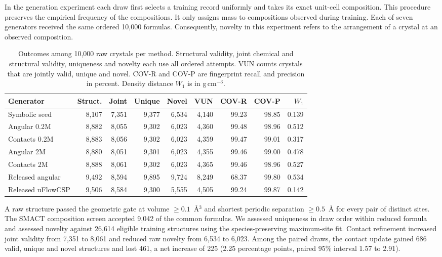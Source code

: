 In the generation experiment each draw first selects a training record uniformly and takes its exact unit-cell composition. This procedure preserves the empirical frequency of the compositions. It only assigns mass to compositions observed during training. Each of seven generators received the same ordered 10,000 formulas. Consequently, novelty in this experiment refers to the arrangement of a crystal at an observed composition.

\begin{table}[tbp]\centering\small
\caption{Outcomes among 10,000 raw crystals per method. Structural validity, joint chemical and structural validity, uniqueness and novelty each use all ordered attempts. VUN counts crystals that are jointly valid, unique and novel. COV-R and COV-P are fingerprint recall and precision in percent. Density distance $W_1$ is in g\,cm$^{-3}$.}
\label{tab:gen-dn}
\setlength{\tabcolsep}{3pt}
\begin{tabular}{lrrrrrrrr}\hline
Generator & Struct. & Joint & Unique & Novel & VUN & COV-R & COV-P & $W_1$\\\hline
Symbolic seed & 8,107 & 7,351 & 9,377 & 6,534 & 4,140 & 99.23 & 98.85 & 0.139\\
Angular 0.2M & 8,882 & 8,055 & 9,302 & 6,023 & 4,360 & 99.48 & 98.96 & 0.512\\
Contacts 0.2M & 8,883 & 8,056 & 9,302 & 6,023 & 4,359 & 99.47 & 99.01 & 0.317\\
Angular 2M & 8,880 & 8,051 & 9,301 & 6,023 & 4,355 & 99.46 & 99.00 & 0.478\\
Contacts 2M & 8,888 & 8,061 & 9,302 & 6,023 & 4,365 & 99.46 & 98.96 & 0.527\\
Released angular & 9,492 & 8,594 & 9,895 & 9,724 & 8,249 & 68.37 & 99.80 & 0.534\\
Released uFlowCSP & 9,506 & 8,584 & 9,300 & 5,555 & 4,505 & 99.24 & 99.87 & 0.142\\\hline
\end{tabular}
\end{table}

A raw structure passed the geometric gate at volume $\geq0.1$~\AA$^3$ and shortest periodic separation $\geq0.5$~\AA{} for every pair of distinct sites. The SMACT composition screen \cite{smact} accepted 9,042 of the common formulas. We assessed uniqueness in draw order within reduced formula and assessed novelty against 26,614 eligible training structures using the species-preserving maximum-site fit. Contact refinement increased joint validity from 7,351 to 8,061 and reduced raw novelty from 6,534 to 6,023. Among the paired draws, the contact update gained 686 valid, unique and novel structures and lost 461, a net increase of 225 (2.25 percentage points, paired 95\% interval 1.57 to 2.91).

